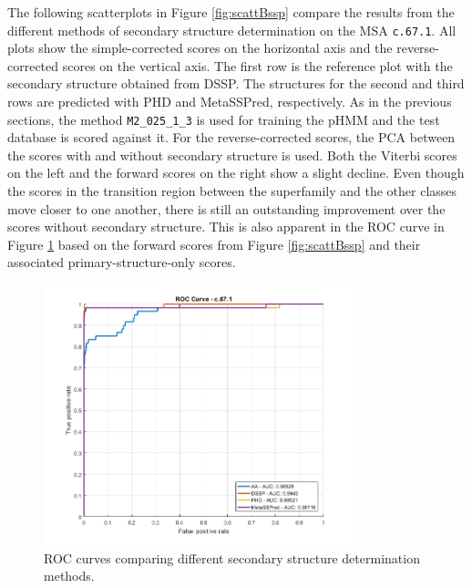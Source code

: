 The following scatterplots in Figure \ref{fig:scattBssp} compare the results from the different methods of  secondary structure determination on the \ac{MSA} \texttt{c.67.1}. All plots show the simple-corrected scores on the horizontal axis and the reverse-corrected scores on the vertical axis.
 The first row is the reference plot with the secondary structure obtained from \ac{DSSP}.
 The structures for the second and third rows are predicted with \ac{PHD} and MetaSSPred, respectively.  
As in the previous sections, the method \texttt{M2\_025\_1\_3} is used for training the \ac{pHMM} and the test database is scored against it. 
For the \mbox{reverse-corrected} scores, the \ac{PCA} between the scores with and without secondary structure is used. Both the Viterbi scores on the left and the forward scores on the right show a slight decline. Even though the scores in the transition region between the superfamily and the other classes move closer to one another, there is still an outstanding improvement over the scores without secondary structure. This is also apparent in the \ac{ROC} curve in Figure \ref{fig:rocSS} based on the forward scores from Figure \ref{fig:scattBssp} and their associated primary-structure-only scores.

\begin{figure}[H]
	\begin{center}
		\includegraphics[width=0.8\textwidth]{fig/SSAuc}
	\end{center}
	\caption{\acs{ROC} curves comparing different secondary structure determination methods.} 
	\label{fig:rocSS}
\end{figure}